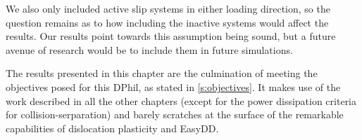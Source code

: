 We also only included active slip systems in either loading direction, so the question remains as to how including the inactive systems would affect the results. Our results point towards this assumption being sound, but a future avenue of research would be to include them in future simulations.

The results presented in this chapter are the culmination of meeting the objectives posed for this DPhil, as stated in \cref{s:objectives}. It makes use of the work described in all the other chapters (except for the power dissipation criteria for collision-serparation) and barely scratches at the surface of the remarkable capabilities of dislocation plasticity and EasyDD.
\savearabiccounter

